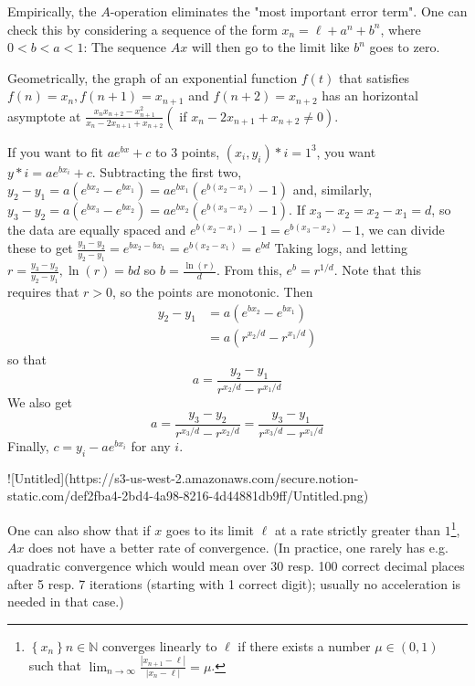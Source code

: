 Empirically, the $A$-operation eliminates the "most important error term". One can check this by considering a sequence of the form $x_{n}=\ell+a^{n}+b^{n}$, where $0<b<a<1$: The sequence $A x$ will then go to the limit like $b^{n}$ goes to zero.

Geometrically, the graph of an exponential function $f(t)$ that satisfies \(f(n)=x_{n}, f(n+1)=x_{n+1}\) and \(f(n+2)=x_{n+2}\) has an horizontal asymptote at \(\frac{x_{n} x_{n+2}-x_{n+1}^{2}}{x_{n}-2 x_{n+1}+x_{n+2}}\left(\right.\) if \(\left.x_{n}-2 x_{n+1}+x_{n+2} \neq 0\right)\).

If you want to fit \(a e^{b x}+c\) to 3 points, \(\left(x_{i}, y_{i}\right)*{i=1}^{3}\), you want \(y*{i}=a e^{b x_{i}}+c .\)
Subtracting the first two, \(y_{2}-y_{1}=a\left(e^{b x_{2}}-e^{b x_{1}}\right)=a e^{b x_{1}}\left(e^{b\left(x_{2}-x_{1}\right)}-1\right)\) and, similarly, \(y_{3}-y_{2}=a\left(e^{b x_{3}}-e^{b x_{2}}\right)=a e^{b x_{2}}\left(e^{b\left(x_{3}-x_{2}\right)}-1\right) .\)
If \(x_{3}-x_{2}=x_{2}-x_{1}=d\), so the data are equally spaced and \(e^{b\left(x_{2}-x_{1}\right)}-1=e^{b\left(x_{3}-x_{2}\right)}-1\), we can divide these to get
\(\frac{y_{3}-y_{2}}{y_{2}-y_{1}}=e^{b x_{2}-b x_{1}}=e^{b\left(x_{2}-x_{1}\right)}=e^{b d}\)
Taking logs, and letting \(r=\frac{y_{3}-y_{2}}{y_{2}-y_{1}}, \ln (r)=b d\) so \(b=\frac{\ln (r)}{d} .\) From this, \(e^{b}=r^{1 / d} .\)
Note that this requires that \(r>0\), so the points are monotonic.
Then
\[
\begin{aligned}
y_{2}-y_{1} &=a\left(e^{b x_{2}}-e^{b x_{1}}\right) \\
&=a\left(r^{x_{2} / d}-r^{x_{1} / d}\right)
\end{aligned}
\]
so that
\[
a=\frac{y_{2}-y_{1}}{r^{x_{2} / d}-r^{x_{1} / d}}
\]
We also get
\[
a=\frac{y_{3}-y_{2}}{r^{x_{3} / d}-r^{x_{2} / d}}=\frac{y_{3}-y_{1}}{r^{x_{3} / d}-r^{x_{1} / d}}
\]
Finally, \(c=y_{i}-a e^{b x_{i}}\) for any \(i\).

![Untitled](https://s3-us-west-2.amazonaws.com/secure.notion-static.com/def2fba4-2bd4-4a98-8216-4d44881db9ff/Untitled.png)

One can also show that if \(x\) goes to its limit \(\ell\) at a rate strictly greater than \(1\)\footnote{$\left\{x_{n}\right\}{n \in \mathbb{N}}$ converges linearly to $\ell$ if there exists a number $\mu \in(0,1)$ such that \(\lim_{n \rightarrow \infty} \frac{\left|x_{n+1}-\ell\right|}{\left|x_{n}-\ell\right|}=\mu\).}, \(A x\) does not have a better rate of convergence.
(In practice, one rarely has e.g. quadratic convergence which would mean over 30 resp. 100 correct decimal places after 5 resp. 7 iterations (starting with 1 correct digit); usually no acceleration is needed in that case.)

